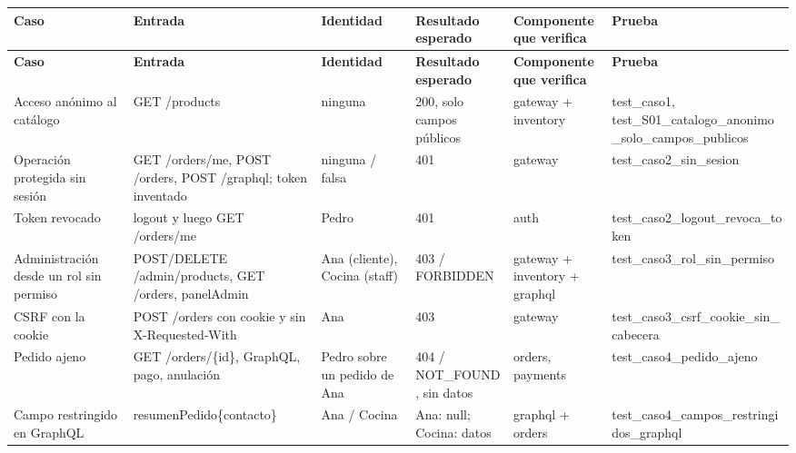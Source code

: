 \documentclass[10pt,letterpaper]{article}
\begin{document}
{\footnotesize
\begin{longtable}{|P{\tabcolsep\relax}|P{\tabcolsep\relax}|P{\tabcolsep\relax}|P{\tabcolsep\relax}|P{\tabcolsep\relax}|P{\tabcolsep\relax}|}
\hline
\textbf{Caso} & \textbf{Entrada} & \textbf{Identidad} & \textbf{Resultado esperado} & \textbf{Componente que verifica} & \textbf{Prueba} \\ \hline
\endfirsthead
\hline
\textbf{Caso} & \textbf{Entrada} & \textbf{Identidad} & \textbf{Resultado esperado} & \textbf{Componente que verifica} & \textbf{Prueba} \\ \hline
\endhead
Acceso anónimo al catálogo & GET /\allowbreak{}products & ninguna & 200, solo campos públicos & gateway + inventory & test\_\allowbreak{}caso1, test\_\allowbreak{}S01\_\allowbreak{}catalogo\_\allowbreak{}anonimo\_\allowbreak{}solo\_\allowbreak{}campos\_\allowbreak{}publicos \\ \hline
Operación protegida sin sesión & GET /\allowbreak{}orders/\allowbreak{}me, POST /\allowbreak{}orders, POST /\allowbreak{}graphql; token inventado & ninguna /\allowbreak{} falsa & 401 & gateway  & test\_\allowbreak{}caso2\_\allowbreak{}sin\_\allowbreak{}sesion \\ \hline
Token revocado & logout y luego GET /\allowbreak{}orders/\allowbreak{}me & Pedro & 401 & auth & test\_\allowbreak{}caso2\_\allowbreak{}logout\_\allowbreak{}revoca\_\allowbreak{}token \\ \hline
Administración desde un rol sin permiso & POST/\allowbreak{}DELETE /\allowbreak{}admin/\allowbreak{}products, GET /\allowbreak{}orders, panelAdmin & Ana (cliente), Cocina (staff) & 403 /\allowbreak{} FORBIDDEN & gateway + inventory + graphql & test\_\allowbreak{}caso3\_\allowbreak{}rol\_\allowbreak{}sin\_\allowbreak{}permiso \\ \hline
CSRF con la cookie & POST /\allowbreak{}orders con cookie y sin X-Requested-With & Ana & 403 & gateway & test\_\allowbreak{}caso3\_\allowbreak{}csrf\_\allowbreak{}cookie\_\allowbreak{}sin\_\allowbreak{}cabecera \\ \hline
Pedido ajeno & GET /\allowbreak{}orders/\allowbreak{}\{id\}, GraphQL, pago, anulación & Pedro sobre un pedido de Ana & 404 /\allowbreak{} NOT\_\allowbreak{}FOUND, sin datos & orders, payments & test\_\allowbreak{}caso4\_\allowbreak{}pedido\_\allowbreak{}ajeno \\ \hline
Campo restringido en GraphQL & resumenPedido\{contacto\} & Ana /\allowbreak{} Cocina & Ana: null; Cocina: datos & graphql + orders & test\_\allowbreak{}caso4\_\allowbreak{}campos\_\allowbreak{}restringidos\_\allowbreak{}graphql \\ \hline

\end{longtable}}
\end{document}
